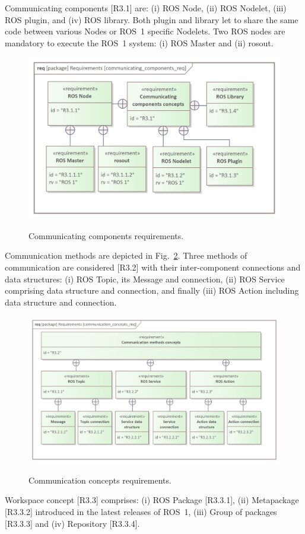 \documentclass[11pt,oneside,a4paper]{article}
\begin{document}
	Communicating components [R3.1] are: (i) ROS Node, (ii) ROS Nodelet, (iii) ROS plugin, and (iv) ROS library. Both plugin and library let to share the same code between various Nodes or ROS~1 specific Nodelets. Two ROS nodes are mandatory to execute the ROS~1 system: (i) ROS Master and (ii) rosout.

	\begin{figure}[H]
		\centering
		\begin{center}
			{\includegraphics[scale=1]{img/requirement_pkg/communicating_components_req.png}}
		\end{center}
		\caption{Communicating components requirements.} 
		\label{fig:communicating_components_req}
	\end{figure}
	Communication methods are depicted in Fig.~\ref{fig:communication_concepts_req}.
	 Three methods of communication are considered [R3.2] with their inter-component connections and data structures: (i) ROS Topic, its Message and connection, (ii) ROS Service comprising data structure and connection, and finally (iii) ROS Action including data structure and connection.
	
	\begin{figure}[H]
		\centering
		\begin{center}
			{\includegraphics[scale=1]{img/requirement_pkg/communication_concepts_req.png}}
		\end{center}
		\caption{Communication concepts requirements.} 
		\label{fig:communication_concepts_req}
	\end{figure}
	Workspace concept [R3.3] comprises: (i) ROS Package [R3.3.1], (ii) Metapackage [R3.3.2] introduced in the latest releases of ROS~1, (iii) Group of packages [R3.3.3] and (iv) Repository [R3.3.4].
	
\end{document}
